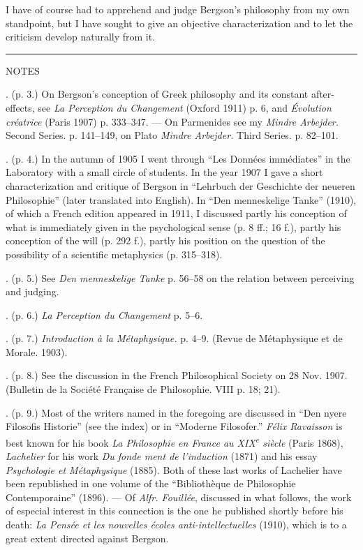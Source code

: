 \documentclass[12pt,a4paper,openany]{book}
\newcommand{\opage}[1]{\marginnote{\footnotesize\textit{[#1]}}}
\newcommand{\chapterend}{\par\begin{center}\rule{2.5cm}{0.4pt}\end{center}}
\newcommand{\noterhead}[1]{\phantomsection\addcontentsline{toc}{chapter}{#1}\vspace*{6cm}\begin{center}{\Large #1}\end{center}}
\newcommand{\notelabel}[1]{\noindent #1}
\begin{document}
I have of course had to apprehend and judge Bergson's philosophy from my own standpoint, but I have sought to give an objective characterization and to let the criticism develop naturally from it.

\chapterend

\clearpage
\opage{63}\noterhead{NOTES}
\clearpage
\begin{small}

\opage{65}\notelabel{1.} (p. 3.) On Bergson's conception of Greek philosophy and its constant after-effects, see \textit{La Perception du Changement} (Oxford 1911) p. 6, and \textit{Évolution créatrice} (Paris 1907) p. 333--347. --- On Parmenides see my \textit{Mindre Arbejder.} Second Series. p. 141--149, on Plato \textit{Mindre Arbejder.} Third Series. p. 82--101.

\notelabel{2.} (p. 4.) In the autumn of 1905 I went through ``Les Données immédiates'' in the Laboratory with a small circle of students. In the year 1907 I gave a short characterization and critique of Bergson in ``Lehrbuch der Geschichte der neueren Philosophie'' (later translated into English). In ``Den menneskelige Tanke'' (1910), of which a French edition appeared in 1911, I discussed partly his conception of what is immediately given in the psychological sense (p. 8 ff.; 16 f.), partly his conception of the will (p. 292 f.), partly his position on the question of the possibility of a scientific metaphysics (p. 315--318).

\notelabel{3.} (p. 5.) See \textit{Den menneskelige Tanke} p. 56--58 on the relation between perceiving and judging.

\notelabel{4.} (p. 6.) \textit{La Perception du Changement} p. 5--6.

\notelabel{5.} (p. 7.) \textit{Introduction à la Métaphysique.} p. 4--9. (Revue de Métaphysique et de Morale. 1903).

\notelabel{6.} (p. 8.) See the discussion in the French Philosophical Society on 28 Nov. 1907. (Bulletin de la Société Française de Philosophie. VIII p. 18; 21).

\notelabel{7.} (p. 9.) Most of the writers named in the foregoing are discussed in ``Den nyere Filosofis Historie'' (see the index) or in ``Moderne Filosofer.'' \emph{Félix Ravaisson} is best known for his book \textit{La Philosophie en France au XIX\textsuperscript{e} siècle} (Paris 1868), \emph{Lachelier} for his work \textit{Du fonde%
\opage{66}ment de l'induction} (1871) and his essay \textit{Psychologie et Métaphysique} (1885). Both of these last works of Lachelier have been republished in one volume of the ``Bibliothèque de Philosophie Contemporaine'' (1896). --- Of \emph{Alfr. Fouillée}, discussed in what follows, the work of especial interest in this connection is the one he published shortly before his death: \textit{La Pensée et les nouvelles écoles anti-intellectuelles} (1910), which is to a great extent directed against Bergson.


\end{small}
\end{document}
